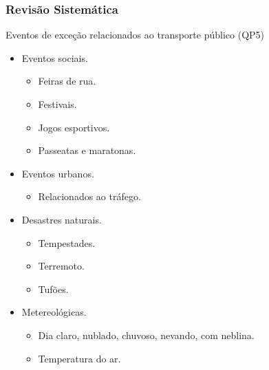 \documentclass{beamer}
\begin{document}
\begin{frame}
\frametitle{Revisão Sistemática}
\begin{block}{Eventos de exceção relacionados ao transporte público (QP5)}
\begin{itemize}
\item Eventos sociais.
\begin{itemize}
\item Feiras de rua.
\item Festivais.
\item Jogos esportivos.
\item Passeatas e maratonas.
\end{itemize}

\item Eventos urbanos.
\begin{itemize}
\item Relacionados ao tráfego.
\end{itemize}

\item Desastres naturais.
\begin{itemize}
\item Tempestades.
\item Terremoto.
\item Tufões.
\end{itemize}

\item Metereológicas.
\begin{itemize}
\item Dia claro, nublado, chuvoso, nevando, com neblina.
\item Temperatura do ar.
\end{itemize}

\end{itemize}
\end{block}
\end{frame}
\end{document}

